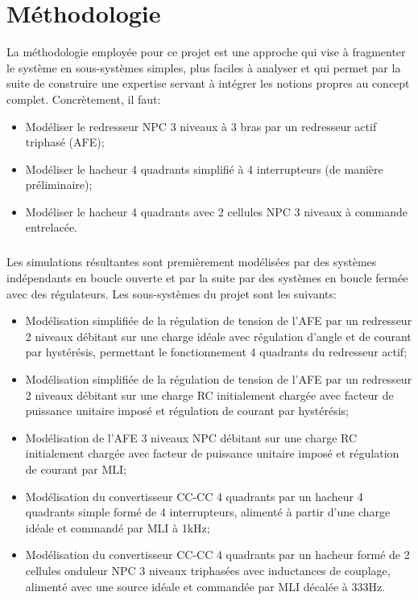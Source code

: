 \titlespacing{\chapter}{0pt}{0pt}{40pt}
\chapter{Méthodologie}
La méthodologie employée pour ce projet est une approche qui vise à fragmenter le système en sous-systèmes simples, plus faciles à analyser et qui permet par la suite de construire une expertise servant à intégrer les notions propres au concept complet. Concrètement, il faut:
\begin{itemize}
\item Modéliser le redresseur NPC 3 niveaux à 3 bras par un redresseur actif triphasé (AFE);
\item Modéliser le hacheur 4 quadrants simplifié à 4 interrupteurs (de manière préliminaire);
\item Modéliser le hacheur 4 quadrants avec 2 cellules NPC 3 niveaux à commande entrelacée.
\end{itemize}
\paragraph{} Les simulations résultantes sont premièrement modélisées par des systèmes indépendants en boucle ouverte et par la suite par des systèmes en boucle fermée avec des régulateurs. Les sous-systèmes du projet sont les suivants:
\begin{itemize}
\item Modélisation simplifiée de la régulation de tension de l'AFE par un redresseur 2 niveaux débitant sur une charge idéale avec régulation d'angle et de courant par hystérésis, permettant le fonctionnement 4 quadrants du redresseur actif;
\item Modélisation simplifiée de la régulation de tension  de l'AFE par un redresseur 2 niveaux débitant sur une charge RC initialement chargée avec facteur de puissance unitaire imposé et régulation de courant par hystérésis;
\item Modélisation de l'AFE 3 niveaux NPC  débitant sur une charge RC initialement chargée avec facteur de puissance unitaire imposé et régulation de courant par MLI;
\item Modélisation du convertisseur CC-CC 4 quadrants par un hacheur 4 quadrants simple formé de 4 interrupteurs, alimenté à partir d'une charge idéale et commandé par MLI à 1kHz;
\item Modélisation du convertisseur CC-CC 4 quadrants par un hacheur formé de 2 cellules onduleur NPC 3 niveaux triphasées avec inductances de couplage, alimenté avec une source idéale et commandée par MLI décalée à 333Hz.
\end{itemize}

